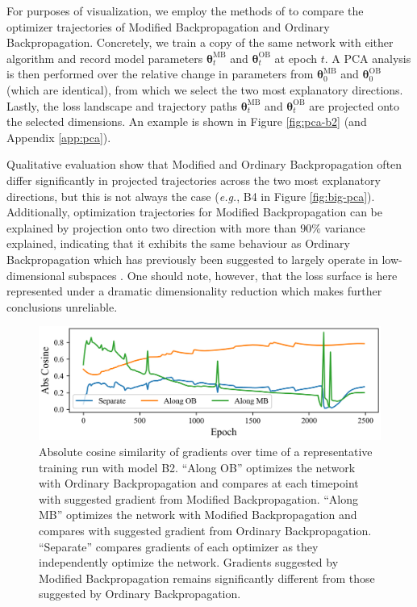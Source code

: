 \documentclass{article}
\theoremstyle{plain}
\theoremstyle{definition}
\theoremstyle{remark}
\newcommand{\vtheta}{\bm{\theta}}
\begin{document}
For purposes of visualization, we employ the methods of \citealt{li-visualizing} to compare the optimizer trajectories of Modified Backpropagation and Ordinary Backpropagation. Concretely, we train a copy of the same network with either algorithm and record model parameters $\vtheta_t^{\mathrm{MB}}$ and $\vtheta_t^{\mathrm{OB}}$ at epoch $t$. A PCA analysis is then performed over the relative change in parameters from $\vtheta_0^{\mathrm{MB}}$ and $\vtheta_0^{\mathrm{OB}}$ (which are identical), from which we select the two most explanatory directions. Lastly, the loss landscape and trajectory paths $\vtheta_t^{\mathrm{MB}}$ and $\vtheta_t^{\mathrm{OB}}$ are projected onto the selected dimensions. An example is shown in Figure \ref{fig:pca-b2} (and Appendix \ref{app:pca}).

Qualitative evaluation show that Modified and Ordinary Backpropagation often differ significantly in projected trajectories across the two most explanatory directions, but this is not always the case (\textit{e.g.}, B4 in Figure \ref{fig:big-pca}). Additionally, optimization trajectories for Modified Backpropagation can be explained by projection onto two direction with more than $90\%$ variance explained, indicating that it exhibits the same behaviour as Ordinary Backpropagation which has previously been suggested to largely operate in low-dimensional subspaces \cite{li-visualizing,song-subspaces}. One should note, however, that the loss surface is here represented under a dramatic dimensionality reduction which makes further conclusions unreliable.

\begin{figure}[h]
    \centering
    \includegraphics[width=0.95\columnwidth]{./resources/cos.png}
    \caption{Absolute cosine similarity of gradients over time of a representative training run with model B2. ``Along OB'' optimizes the network with Ordinary Backpropagation and compares at each timepoint with suggested gradient from Modified Backpropagation. ``Along MB'' optimizes the network with Modified Backpropagation and compares with suggested gradient from Ordinary Backpropagation. ``Separate'' compares gradients of each optimizer as they independently optimize the network. Gradients suggested by Modified Backpropagation remains significantly different from those suggested by Ordinary Backpropagation.}
    \label{fig:cos-b2}
\end{figure}
\end{document}
